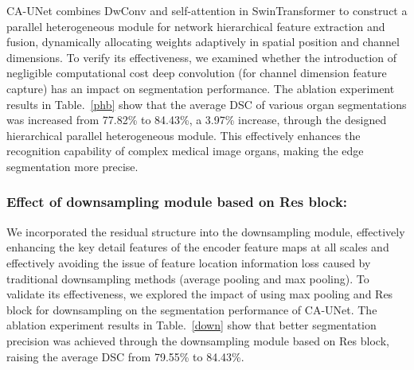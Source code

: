 CA-UNet combines DwConv and self-attention in SwinTransformer to construct a parallel heterogeneous module for network hierarchical feature extraction and fusion, dynamically allocating weights adaptively in spatial position and channel dimensions. To verify its effectiveness, we examined whether the introduction of negligible computational cost deep convolution (for channel dimension feature capture) has an impact on segmentation performance. The ablation experiment results in Table.~\ref{phb} show that the average DSC of various organ segmentations was increased from 77.82\% to 84.43\%, a 3.97\% increase, through the designed hierarchical parallel heterogeneous module. This effectively enhances the recognition capability of complex medical image organs, making the edge segmentation more precise.

\begin{table}[htbp]
\caption{Ablation study on the effect of the parallel heterogeneous module:}\label{phb}
\footnotesize
{}
\centering
\end{table}

\subsubsection{Effect of downsampling module based on Res block:}

We incorporated the residual structure into the downsampling module, effectively enhancing the key detail features of the encoder feature maps at all scales and effectively avoiding the issue of feature location information loss caused by traditional downsampling methods (average pooling and max pooling). To validate its effectiveness, we explored the impact of using max pooling and Res block for downsampling on the segmentation performance of CA-UNet. The ablation experiment results in Table.~\ref{down} show that better segmentation precision was achieved through the downsampling module based on Res block, raising the average DSC from 79.55\% to 84.43\%.

